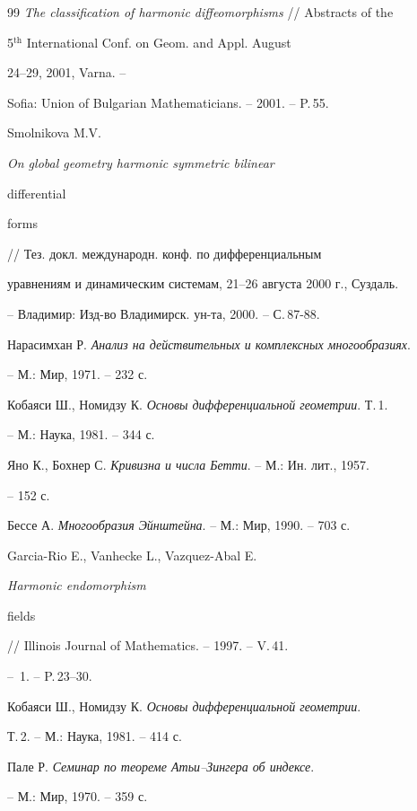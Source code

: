 \begin{thebibliography}{99}
{\em The classification of harmonic diffeomorphisms} // Abstracts of the 


5${}^{\mathrm{th}}$ International Conf. on Geom. and Appl. August 


24--29, 2001, Varna. -- 


Sofia: Union of Bulgarian Mathematicians. -- 2001. -- P.\,55. 




Smolnikova M.V. {\em On global geometry harmonic symmetric bilinear 


differential 


forms} // Тез. докл. международн. конф. по дифференциальным 


уравнениям и динамическим системам, 21--26 августа 2000 г., Суздаль. 


-- Владимир: Изд-во Владимирск. ун-та, 2000. -- С.\,87-88. 




Нарасимхан Р. {\em Анализ на действительных и комплексных многообразиях}. 


-- М.: Мир, 1971. -- 232 с. 




Кобаяси Ш., Номидзу К. {\em Основы дифференциальной геометрии}. Т.\,1. 


-- М.: Наука, 1981. -- 344 с. 




Яно К., Бохнер С. {\em Кривизна и числа Бетти}. -- М.: Ин. лит., 1957. 


-- 152 с. 




Бессе А. {\em Многообразия Эйнштейна}. -- М.: Мир, 1990. -- 703 с. 




Garcia-Rio E., Vanhecke L., Vazquez-Abal E. {\em Harmonic endomorphism 


fields} // Illinois Journal of Mathematics. -- 1997. -- V.\,41. 


-- \No\,1. -- P.\,23--30. 




Кобаяси Ш., Номидзу К. {\em Основы дифференциальной геометрии}. 


Т.\,2. -- М.: Наука, 1981. -- 414 с. 




Пале Р. {\em Семинар по теореме Атьи--Зингера об индексе}. 


-- М.: Мир, 1970. -- 359 с. 


 


\end{thebibliography} 


 


\vskip 2cm 


 






\smallskip 




 


\label{end} 


 


